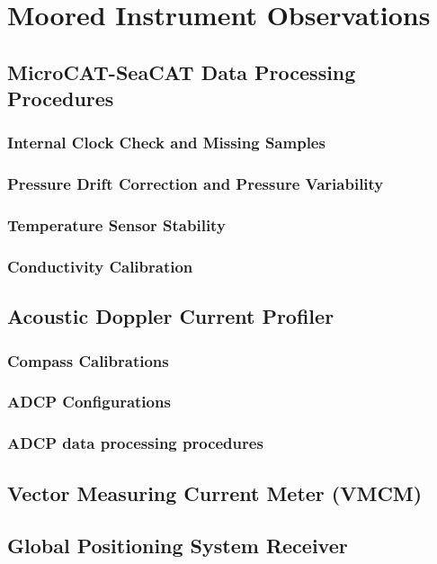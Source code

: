 \section{Moored Instrument Observations}

\subsection{MicroCAT-SeaCAT Data Processing Procedures}

\subsubsection{Internal Clock Check and Missing Samples}
\subsubsection{Pressure Drift Correction and Pressure Variability}
\subsubsection{Temperature Sensor Stability}
\subsubsection{Conductivity Calibration}

\subsection{Acoustic Doppler Current Profiler}

\subsubsection{Compass Calibrations}
\subsubsection{ADCP Configurations}
\subsubsection{ADCP data processing procedures}

\subsection{Vector Measuring Current Meter (VMCM)}

\subsection{Global Positioning System Receiver}

